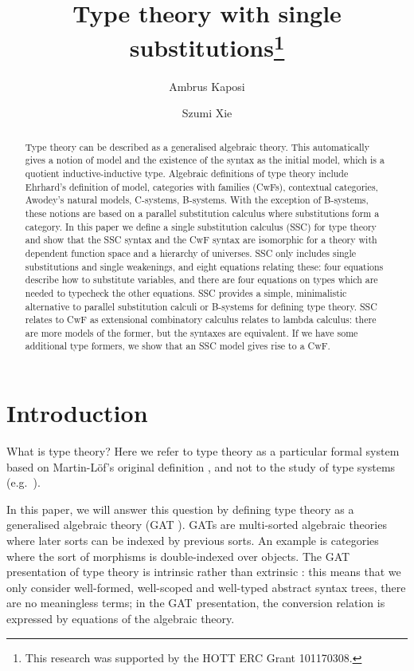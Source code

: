 \documentclass[submission,copyright,creativecommons]{eptcs}
\title{Type theory with single substitutions\thanks{This research was supported by the HOTT ERC Grant 101170308.}}
\author{Ambrus Kaposi
\institute{Eötvös Loránd University (ELTE)\\
Budapest, Hungary}
\email{akaposi@inf.elte.hu}
\and
Szumi Xie
\institute{Eötvös Loránd University (ELTE)\\
Budapest, Hungary}
\email{szumi@inf.elte.hu}
}
\begin{document}
\maketitle

\begin{abstract}
Type theory can be described as a generalised algebraic theory. This
automatically gives a notion of model and the existence of the syntax
as the initial model, which is a quotient inductive-inductive
type. Algebraic definitions of type theory include Ehrhard's
definition of model, categories with families (CwFs), contextual
categories, Awodey's natural models, C-systems, B-systems. With the
exception of B-systems, these notions are based on a parallel
substitution calculus where substitutions form a category. In this
paper we define a single substitution calculus (SSC) for type theory
and show that the SSC syntax and the CwF syntax are isomorphic for a
theory with dependent function space and a hierarchy of universes. SSC
only includes single substitutions and single weakenings, and eight
equations relating these: four equations describe how to substitute
variables, and there are four equations on types which are needed to
typecheck the other equations. SSC provides a simple, minimalistic
alternative to parallel substitution calculi or B-systems for defining
type theory. SSC relates to CwF as extensional combinatory calculus
relates to lambda calculus: there are more models of the former, but
the syntaxes are equivalent. If we have some additional type formers,
we show that an SSC model gives rise to a CwF.
\end{abstract}

\section{Introduction}

What is type theory? Here we refer to type theory as a particular
formal system based on Martin-Löf's original definition
\cite{MARTINLOF197573}, and not to the study of type systems
(e.g.\ \cite{DBLP:books/daglib/0005958}).

In this paper, we will answer this question by defining type theory as
a generalised algebraic theory (GAT
\cite{DBLP:journals/apal/Cartmell86}). GATs are multi-sorted algebraic
theories where later sorts can be indexed by previous sorts. An
example is categories where the sort of morphisms is double-indexed
over objects.
%
The GAT presentation of type theory is intrinsic
\cite{DBLP:conf/csl/AltenkirchR99,DBLP:conf/popl/AltenkirchK16} rather
than extrinsic
\cite{alti:phd93,abel2013normalization,DBLP:conf/cpp/AdjedjLMPP24}:
this means that we only consider well-formed, well-scoped and
well-typed abstract syntax trees, there are no meaningless terms; in
the GAT presentation, the conversion relation is expressed by
equations of the algebraic theory.
\end{document}
